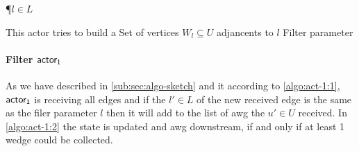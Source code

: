 \begin{algorithm}
\P{$l \in L$}
\BlankLine
{}
\caption{This actor tries to build a Set of vertices $W_l \subseteq U$ adjancents to $l$ Filter parameter }
\label{algo:act-1}
\end{algorithm}

\paragraph{Filter $\mathsf{actor_1}$} As we have described in \autoref{sub:sec:algo-sketch} and it according to \autoref{algo:act-1:1}, $\mathsf{actor_1}$ is receiving all edges 
and if the $l' \in L$ of the new received edge is the same as the filer parameter $l$ then it will add to the list of \acrshort{awg} the $u' \in U$ received. 
In \autoref{algo:act-1:2} the state is updated and \acrshort{awg} downstream, if and only if at least 1 wedge could be collected. 

